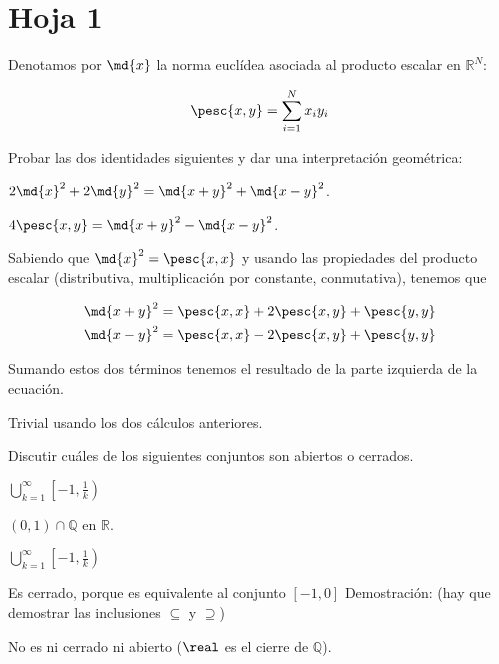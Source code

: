\section{Hoja 1}

\begin{problem}[1] Denotamos por $\md{x}$ la norma euclídea asociada al producto escalar en $ℝ^N$:

\[ \pesc{x,y} = \sum_{i=1}^Nx_iy_i \]

Probar las dos identidades siguientes y dar una interpretación geométrica:

\ppart $2\md{x}^2 + 2\md{y}^2 = \md{x+y}^2 + \md{x-y}^2$.

\ppart $4\pesc{x,y} = \md{x+y}^2 - \md{x-y}^2$.

\solution

\spart Sabiendo que $\md{x}^2 = \pesc{x,x}$ y usando las propiedades del producto escalar (distributiva, multiplicación por constante, conmutativa), tenemos que 

\begin{gather*}
\md{x+y}^2 = \pesc{x,x} + 2\pesc{x,y} + \pesc{y,y} \\ 
\md{x-y}^2 = \pesc{x,x} - 2\pesc{x,y} + \pesc{y,y} 
\end{gather*}

Sumando estos dos términos tenemos el resultado de la parte izquierda de la ecuación.

\spart Trivial usando los dos cálculos anteriores.

\end{problem}

\begin{problem}[3] Discutir cuáles de los siguientes conjuntos son abiertos o cerrados.

\ppart $\displaystyle\bigcup_{k=1}^{\infty} \left[-1,\frac{1}{k}\right)$

\ppart $(0,1)\cap ℚ$ en $ℝ$.
\solution

\spart

$\displaystyle\bigcup_{k=1}^{\infty} \left[-1,\frac{1}{k}\right)$

Es cerrado, porque es equivalente al conjunto $[-1,0]$
Demostración: (hay que demostrar las inclusiones $\subseteq$ y $\supseteq$)

\spart
No es ni cerrado ni abierto ($\real$ es el cierre de $\mathbb{Q}$).
 
\end{problem}


